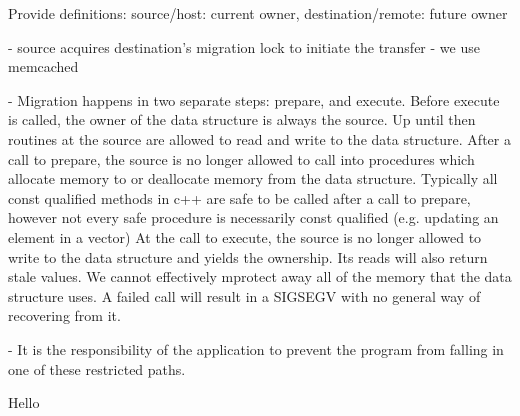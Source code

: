 Provide definitions: source/host: current owner, destination/remote: future owner

- source acquires destination's migration lock to initiate the transfer
    - we use memcached

- Migration happens in two separate steps: prepare, and execute. Before execute
  is called, the owner of the data structure is always the source. Up until then
  routines at the source are allowed to read and write to the data structure.
  After a call to prepare, the source is no longer allowed to call into
  procedures which allocate memory to or deallocate memory from the data structure. Typically all const qualified methods in c++ 
  are safe to be called after a call to prepare, however not every safe procedure is necessarily const qualified (e.g. updating an element in a vector)
  At the call to execute, the source is no longer allowed to write to the data structure and yields the ownership. Its reads will also return stale values.
  We cannot effectively mprotect away all of the memory that the data structure uses. A failed call will result in a SIGSEGV with no general way of
  recovering from it.

  - It is the responsibility of the application to prevent the program from falling in one of these restricted paths.


Hello

